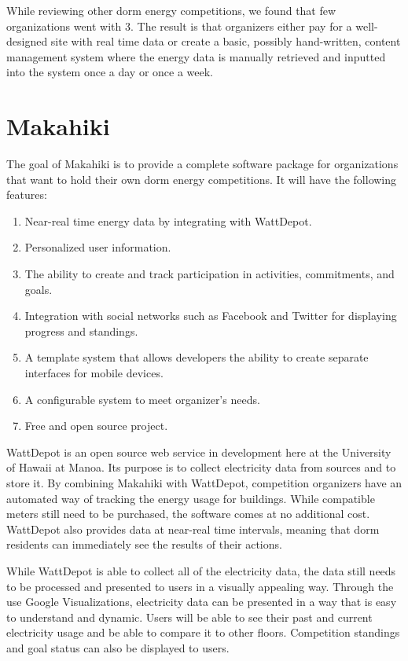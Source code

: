 While reviewing other dorm energy competitions, we found that few organizations went with 3.  The result is that organizers either pay for a well-designed site with real time data or create a basic, possibly hand-written, content management system where the energy data is manually retrieved and inputted into the system once a day or once a week.

\section{Makahiki}

The goal of Makahiki is to provide a complete software package for organizations that want to hold their own dorm energy competitions.  It will have the following features:

\begin{enumerate}
	\item Near-real time energy data by integrating with WattDepot.
	\item Personalized user information.
	\item The ability to create and track participation in activities, commitments, and goals.
	\item Integration with social networks such as Facebook and Twitter for displaying progress and standings.
	\item A template system that allows developers the ability to create separate interfaces for mobile devices.
	\item A configurable system to meet organizer's needs.
	\item Free and open source project.
\end{enumerate}

WattDepot\cite{wattdepot} is an open source web service in development here at the University of Hawaii at Manoa.  Its purpose is to collect electricity data from sources and to store it.  By combining Makahiki with WattDepot, competition organizers have an automated way of tracking the energy usage for buildings.  While compatible meters still need to be purchased, the software comes at no additional cost.  WattDepot also provides data at near-real time intervals, meaning that dorm residents can immediately see the results of their actions.

While WattDepot is able to collect all of the electricity data, the data still needs to be processed and presented to users in a visually appealing way.  Through the use Google Visualizations, electricity data can be presented in a way that is easy to understand and dynamic.  Users will be able to see their past and current electricity usage and be able to compare it to other floors.  Competition standings and goal status can also be displayed to users.

